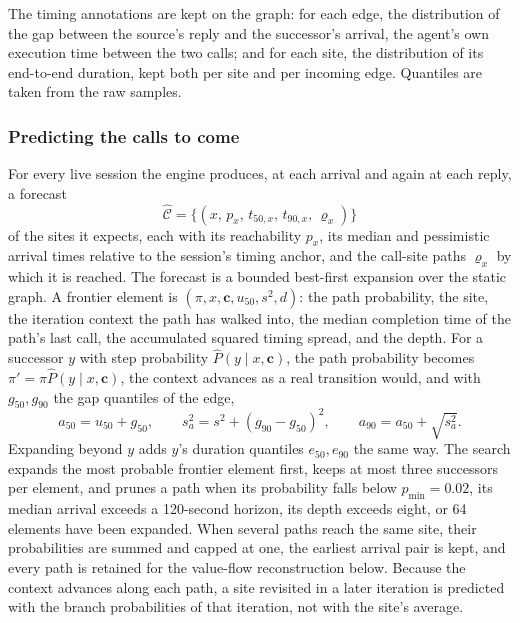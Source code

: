 The timing annotations are kept on the graph: for each edge, the distribution of the gap between the source's reply and the successor's arrival, the agent's own execution time between the two calls; and for each site, the distribution of its end-to-end duration, kept both per site and per incoming edge. Quantiles are taken from the raw samples.

\subsubsection{Predicting the calls to come}
For every live session the engine produces, at each arrival and again at each reply, a forecast
\[
\widehat{\mathcal{C}}=\{(x,\,p_x,\,t_{50,x},\,t_{90,x},\,\varrho_x)\}
\]
of the sites it expects, each with its reachability $p_x$, its median and pessimistic arrival times relative to the session's timing anchor, and the call-site paths $\varrho_x$ by which it is reached. The forecast is a bounded best-first expansion over the static graph. A frontier element is $(\pi,x,\mathbf{c},u_{50},s^2,d)$: the path probability, the site, the iteration context the path has walked into, the median completion time of the path's last call, the accumulated squared timing spread, and the depth. For a successor $y$ with step probability $\widehat{P}(y\mid x,\mathbf{c})$, the path probability becomes $\pi'=\pi\widehat{P}(y\mid x,\mathbf{c})$, the context advances as a real transition would, and with $g_{50},g_{90}$ the gap quantiles of the edge,
\[
a_{50}=u_{50}+g_{50},\qquad s_a^2=s^2+(g_{90}-g_{50})^2,\qquad a_{90}=a_{50}+\sqrt{s_a^2}.
\]
Expanding beyond $y$ adds $y$'s duration quantiles $e_{50},e_{90}$ the same way. The search expands the most probable frontier element first, keeps at most three successors per element, and prunes a path when its probability falls below $p_{\min}=0.02$, its median arrival exceeds a 120-second horizon, its depth exceeds eight, or 64 elements have been expanded. When several paths reach the same site, their probabilities are summed and capped at one, the earliest arrival pair is kept, and every path is retained for the value-flow reconstruction below. Because the context advances along each path, a site revisited in a later iteration is predicted with the branch probabilities of that iteration, not with the site's average.

